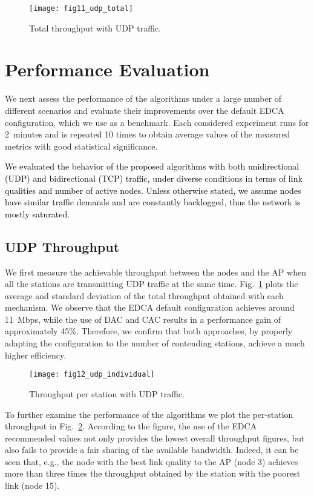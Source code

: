 \documentclass[a4paper,10pt]{article}
\newcommand{\revs}[1]{\textcolor{black}{#1}}
\begin{document}
\begin{figure}[!t]\texttt{[image: fig11\_udp\_total]}\caption{Total throughput with UDP traffic. }\label{fig:udp_total}\end{figure}

\section{Performance Evaluation}
\label{sec:performance}

We next assess the performance of the algorithms under a large number of different scenarios and evaluate their improvements over the default EDCA configuration, which we use as a benchmark. Each considered experiment runs for 2~minutes and is repeated 10 times to obtain average values of the measured metrics with good statistical significance. 

\revs{We evaluated the behavior of the proposed algorithms with both unidirectional (UDP) and bidirectional (TCP) traffic, under diverse conditions in terms of link qualities and number of active nodes. Unless otherwise stated, we assume nodes have similar traffic demands and are constantly backlogged, thus the network is mostly saturated.}



\subsection{UDP Throughput}

We first measure the achievable throughput between the nodes and the AP when all the stations are transmitting UDP traffic at the same time. Fig.~\ref{fig:udp_total} plots the average and standard deviation of the total throughput obtained with each mechanism. We observe that the EDCA default configuration achieves around 11~Mbps, while the use of DAC and CAC results in a performance gain of approximately 45\%. Therefore, we confirm that both approaches, by properly adapting the  configuration to the number of contending stations, achieve a much higher efficiency. 

\begin{figure}[t]\texttt{[image: fig12\_udp\_individual]}\caption{Throughput per station with UDP traffic.\vspace{-0.5em}}\label{fig:udp_throughput_stations}\end{figure}

To further examine the performance of the algorithms we plot the per-station throughput in Fig.~\ref{fig:udp_throughput_stations}. According to the figure, the use of the EDCA recommended values not only provides the lowest overall throughput figures, but also fails to provide a fair sharing of the available bandwidth. Indeed, it can be seen that, e.g., the node with the best link quality to the AP (node 3) achieves more than three times the throughput obtained by the station with the poorest link (node 15).
\end{document}
